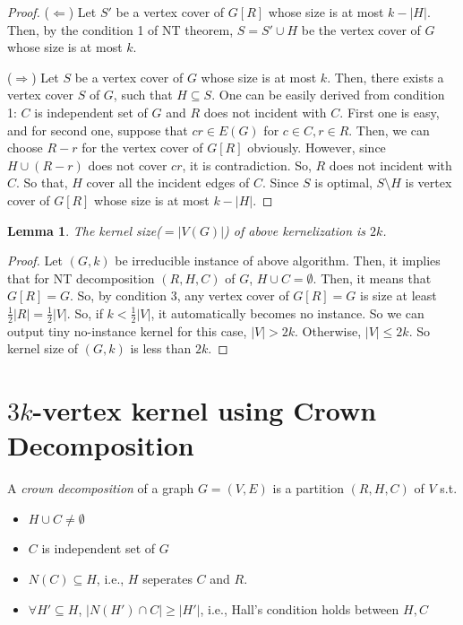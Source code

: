 \documentclass[12pt, a4paper, openany, twoside]{book}
\newtheorem{lem}[thm]{Lemma}
\theoremstyle{definition}
\theoremstyle{remark}
\theoremstyle{plain}
\numberwithin{equation}{section}
\begin{document}
\begin{proof}
    
($\Leftarrow$) Let $S'$ be a vertex cover of $G[R]$ whose size is at most $k - |H|$. Then, by the condition 1 of NT theorem, 
$S = S' \cup H$ be the vertex cover of $G$ whose size is at most $k$. 

($\Rightarrow$) Let $S$ be a vertex cover of $G$ whose size is at most $k$. Then, there exists a vertex cover $S$ of $G$, such that $H \subseteq S$. 
One can be easily derived from condition 1: $C$ is independent set of $G$ and $R$ does not incident with $C$. First one is easy, and for second one, suppose that $cr \in E(G)$ for $c \in C, r \in R$. Then, we can choose $R - r$ for the vertex cover of $G[R]$ obviously. However, 
since $H \cup (R - r)$ does not cover $cr$, it is contradiction. So, $R$ does not incident with $C$. So that, $H$ cover all the incident edges of $C$. 
Since $S$ is optimal, $S \setminus H$ is vertex cover of $G[R]$ whose size is at most $k - |H|$. 

\end{proof}

\begin{lem}
    
The kernel size($=|V(G)|$) of above kernelization is $2k$. 

\end{lem}

\begin{proof}
    
Let $(G, k)$ be irreducible instance of above algorithm. Then, it implies that for NT decomposition $(R, H, C)$ of $G$, 
$H \cup C = \emptyset$. Then, it means that $G[R] = G$. So, by condition 3, any vertex cover of $G[R] = G$ is size at least $\frac{1}{2}|R| = \frac{1}{2}|V|$. 
So, if $k < \frac{1}{2}|V|$, it automatically becomes no instance. So we can output tiny no-instance kernel for this case, $|V| > 2k$. Otherwise, 
$|V| \leq 2k$. So kernel size of $(G, k)$ is less than $2k$. 

\end{proof}

\newpage 

\section{$3k$-vertex kernel using Crown Decomposition}

\begin{tcolorbox}[colback=yellow!10!white,colframe=brown!75!black,title=Crown Decomposition]

A \textit{crown decomposition} of a graph $G = (V, E)$ is a partition $(R, H, C)$ of $V$ s.t. 
\begin{itemize}
    \item $H \cup C \neq \emptyset$
    \item $C$ is independent set of $G$
    \item $N(C) \subseteq H$, i.e., $H$ seperates $C$ and $R$. 
    \item $\forall H' \subseteq H$, $|N(H')\cap C| \geq |H'|$, i.e., Hall's condition holds between $H, C$
\end{itemize}

\end{tcolorbox}
\end{document}
